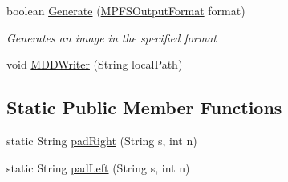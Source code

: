 \begin{DoxyCompactItemize}
\item 
boolean \hyperlink{class_microchip_m_p_f_s_1_1_m_p_f_s2_lib_a6b39322ad9ef8e38f54da7ac97a4d0aa}{Generate} (\hyperlink{enum_microchip_m_p_f_s_1_1_m_p_f_s2_lib_1_1_m_p_f_s_output_format}{M\+P\+F\+S\+Output\+Format} format)
\begin{DoxyCompactList}\small\item\em Generates an image in the specified format \end{DoxyCompactList}\item 
void \hyperlink{class_microchip_m_p_f_s_1_1_m_p_f_s2_lib_ad6147e07633910b2084bd03bb78721bc}{M\+D\+D\+Writer} (String local\+Path)
\end{DoxyCompactItemize}
\subsection*{Static Public Member Functions}
\begin{DoxyCompactItemize}
\item 
static String \hyperlink{class_microchip_m_p_f_s_1_1_m_p_f_s2_lib_ae0a63cc7f9db8c3211fb8fd25655475c}{pad\+Right} (String s, int n)
\item 
static String \hyperlink{class_microchip_m_p_f_s_1_1_m_p_f_s2_lib_af9ca4172356ff0107dccbbf4fc211a76}{pad\+Left} (String s, int n)
\end{DoxyCompactItemize}
